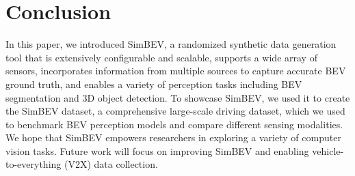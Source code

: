 \section{Conclusion} \label{sec:conclusion}

In this paper, we introduced SimBEV, a randomized synthetic data generation tool that is extensively configurable and scalable, supports a wide array of sensors, incorporates information from multiple sources to capture accurate BEV ground truth, and enables a variety of perception tasks including BEV segmentation and 3D object detection. To showcase SimBEV, we used it to create the SimBEV dataset, a comprehensive large-scale driving dataset, which we used to benchmark BEV perception models and compare different sensing modalities. We hope that SimBEV empowers researchers in exploring a variety of computer vision tasks. Future work will focus on improving SimBEV and enabling vehicle-to-everything (V2X) data collection.

\newpage